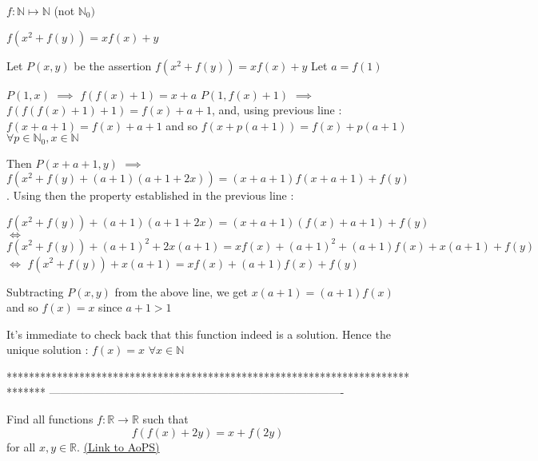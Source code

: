 \begin{solution}
	\begin{tcolorbox}$ f: \mathbb{N} \mapsto \mathbb{N}$  (not $ \mathbb{N}_{0})$

$ f(x^{2} + f(y)) = xf(x) + y$\end{tcolorbox}

Let $ P(x,y)$ be the assertion $ f(x^2+f(y))=xf(x)+y$
Let $ a=f(1)$

$ P(1,x)$ $ \implies$ $ f(f(x)+1)=x+a$
$ P(1,f(x)+1)$ $ \implies$ $ f(f(f(x)+1)+1)=f(x)+a+1$, and, using previous line : $ f(x+a+1)=f(x)+a+1$ and so $ f(x+p(a+1))=f(x)+p(a+1)$ $ \forall p\in\mathbb N_0,x\in\mathbb N$

Then $ P(x+a+1,y)$ $ \implies$ $ f(x^2+f(y)+(a+1)(a+1+2x))=(x+a+1)f(x+a+1)+f(y)$. Using then the property established in the previous line :

$ f(x^2+f(y))+(a+1)(a+1+2x)=(x+a+1)(f(x)+a+1)+f(y)$
$ \iff$ $ f(x^2+f(y))+(a+1)^2+2x(a+1)=xf(x)+(a+1)^2+(a+1)f(x)+x(a+1)+f(y)$
$ \iff$ $ f(x^2+f(y))+x(a+1)=xf(x)+(a+1)f(x)+f(y)$

Subtracting $ P(x,y)$ from the above line, we get $ x(a+1)=(a+1)f(x)$ and so $ f(x)=x$ since $ a+1>1$

It's immediate to check back that this function indeed is a solution. Hence the unique solution : $ \boxed{f(x)=x}$ $ \forall x\in\mathbb N$
\end{solution}
*******************************************************************************
-------------------------------------------------------------------------------

\begin{problem}
	Find all functions $f: \mathbb R \to \mathbb R$ such that
\[ f(f(x)+2y)=x+f(2y)\]
for all $x, y \in \mathbb R$.
	\flushright \href{https://artofproblemsolving.com/community/c6h313709}{(Link to AoPS)}
\end{problem}



